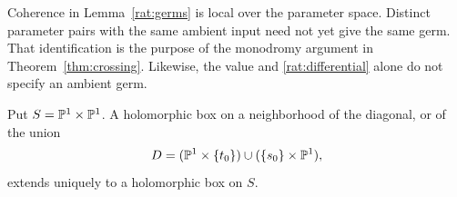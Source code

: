 \begin{remark}\label{rat:coherence}
Coherence in Lemma~\ref{rat:germs} is local over the parameter space.
Distinct parameter pairs with the same ambient input need not yet give
the same germ. That identification is the purpose of the monodromy
argument in Theorem~\ref{thm:crossing}. Likewise, the value and
\eqref{rat:differential} alone do not specify an ambient germ.
\end{remark}

\begin{lemma}\label{rat:extension}
Put $S=\mathbb P^1\times\mathbb P^1$. A holomorphic box on a neighborhood of the
diagonal, or of the union
\[
D=(\mathbb P^1\times\{t_0\})\cup(\{s_0\}\times\mathbb P^1),
\]
extends uniquely to a holomorphic box on $S$.
\end{lemma}

